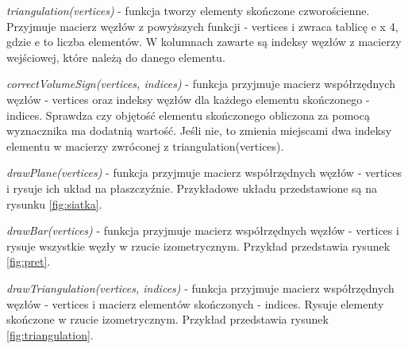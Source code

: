 \textit{triangulation(vertices)} - funkcja tworzy elementy skończone czworościenne. Przyjmuje macierz węzłów z powyższych funkcji - vertices i zwraca tablicę e x 4, gdzie e to liczba elementów. W kolumnach zawarte są indeksy węzłów z macierzy wejściowej, które należą do danego elementu.

\textit{correctVolumeSign(vertices, indices)} - funkcja przyjmuje macierz współrzędnych węzłów - vertices oraz indeksy węzłów dla każdego elementu skończonego - indices. Sprawdza czy objętość elementu skończonego obliczona za pomocą wyznacznika ma dodatnią wartość. Jeśli nie, to zmienia miejscami dwa indeksy elementu w macierzy zwróconej z triangulation(vertices).

\textit{drawPlane(vertices)} - funkcja przyjmuje macierz współrzędnych węzłów - vertices i rysuje ich układ na płaszczyźnie. Przykładowe układu przedstawione są na rysunku \ref{fig:siatka}.

\textit{drawBar(vertices)} - funkcja przyjmuje macierz współrzędnych węzłów - vertices i rysuje wszystkie węzły w rzucie izometrycznym. Przykład przedstawia rysunek \ref{fig:pret}.

\textit{drawTriangulation(vertices, indices)} - funkcja przyjmuje macierz współrzędnych węzłów - vertices i macierz elementów skończonych - indices. Rysuje elementy skończone w rzucie izometrycznym. Przykład przedstawia rysunek \ref{fig:triangulation}.

